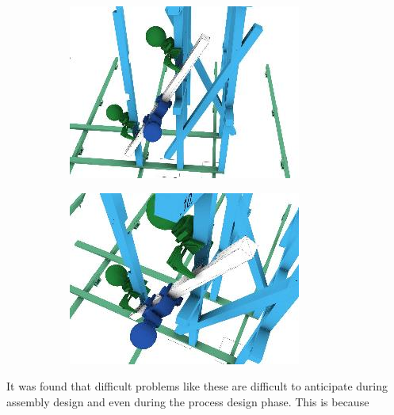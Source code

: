 \documentclass[11pt]{book}
\begin{document}
\begin{figure}[H]
\centering
\begin{subfigure}[b]{0.45\textwidth}
\centering
\includegraphics[width=\textwidth]{./images/image85.jpeg}
\end{subfigure}
\hfill
\begin{subfigure}[b]{0.45\textwidth}
\centering
\includegraphics[width=\textwidth]{./images/image86.jpeg}
\end{subfigure}
\end{figure}


It was found that difficult problems like these are difficult to anticipate during assembly design and even during the process design phase. This is because 
\end{document}
